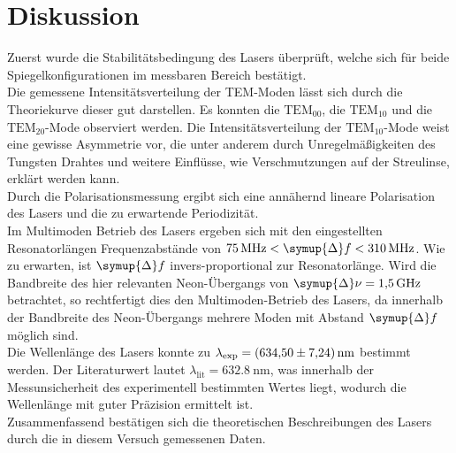 \section{Diskussion}
\label{sec:Diskussion}
Zuerst wurde die Stabilitätsbedingung des Lasers überprüft, welche sich für beide Spiegelkonfigurationen im messbaren Bereich bestätigt. \\
Die gemessene Intensitätsverteilung der TEM-Moden lässt sich durch die Theoriekurve dieser gut darstellen. Es konnten die $\text{TEM}_{00}$,
die $\text{TEM}_{10}$ und die $\text{TEM}_{20}$-Mode observiert werden. Die Intensitätsverteilung der $\text{TEM}_{10}$-Mode weist eine gewisse Asymmetrie vor,
die unter anderem durch Unregelmäßigkeiten des Tungsten Drahtes und weitere Einflüsse, wie Verschmutzungen auf der Streulinse, erklärt werden kann. \\
Durch die Polarisationsmessung ergibt sich eine annähernd lineare Polarisation des Lasers und die zu erwartende Periodizität. \\
Im Multimoden Betrieb des Lasers ergeben sich mit den eingestellten Resonatorlängen Frequenzabstände von $\qty{75}{\mega\hertz} < \symup{\Delta}f < \qty{310}{\mega\hertz}$.
Wie zu erwarten, ist $\symup{\Delta}f$ invers-proportional zur Resonatorlänge. Wird die Bandbreite des hier relevanten Neon-Übergangs von 
$\symup{\Delta}\nu = \qty{1.5}{\giga\hertz}$ \cite{HeNe_Wiki} betrachtet, so rechtfertigt dies den Multimoden-Betrieb des Lasers, da innerhalb der Bandbreite des Neon-Übergangs 
mehrere Moden mit Abstand $\symup{\Delta}f$ möglich sind. \\
Die Wellenlänge des Lasers konnte zu $\lambda_\text{exp} = \qty{634.5 +- 7.24}{\nano\metre}$ bestimmt werden. Der Literaturwert lautet 
$\lambda_\text{lit} =  \qty{632.8}{\nano\metre}$, was innerhalb der Messunsicherheit des experimentell bestimmten Wertes liegt, wodurch 
die Wellenlänge mit guter Präzision ermittelt ist. \\
Zusammenfassend bestätigen sich die theoretischen Beschreibungen des Lasers durch die in diesem Versuch gemessenen Daten.
